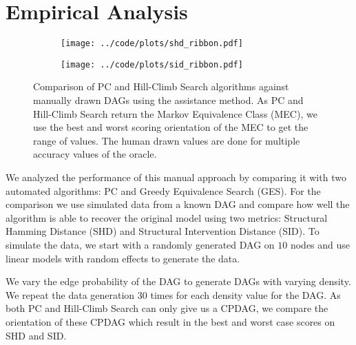 \documentclass[letterpaper]{article} %
\begin{document}


\section{Empirical Analysis}
\label{sec:empirical}

\begin{figure}
	\begin{subfigure}{0.5\textwidth}
		\centering
		\texttt{[image: ../code/plots/shd\_ribbon.pdf]}
		\caption{}
	\end{subfigure}
	\begin{subfigure}{0.5\textwidth}
		\centering
		\texttt{[image: ../code/plots/sid\_ribbon.pdf]}
		\caption{}
	\end{subfigure}
	\caption{Comparison of PC and Hill-Climb Search algorithms against
		manually drawn DAGs using the assistance method. As PC and
		Hill-Climb Search return the Markov Equivalence Class (MEC), we
		use the best and worst scoring orientation of the MEC to get
		the range of values. The human drawn values are done for
	multiple accuracy values of the oracle. }
\end{figure}

We analyzed the performance of this manual approach by comparing it with two
automated algorithms: PC and Greedy Equivalence Search (GES). For the
comparison we use simulated data from a known DAG and compare how well the
algorithm is able to recover the original model using two metrics: Structural
Hamming Distance (SHD) and Structural Intervention Distance (SID). To simulate
the data, we start with a randomly generated DAG on $ 10 $ nodes and use linear
models with random effects to generate the data. 

We vary the edge probability of the DAG to generate DAGs with varying density.
We repeat the data generation $ 30 $ times for each density value for the DAG.
As both PC and Hill-Climb Search can only give us a CPDAG, we compare the
orientation of these CPDAG which result in the best and worst case scores on
SHD and SID.
\end{document}
